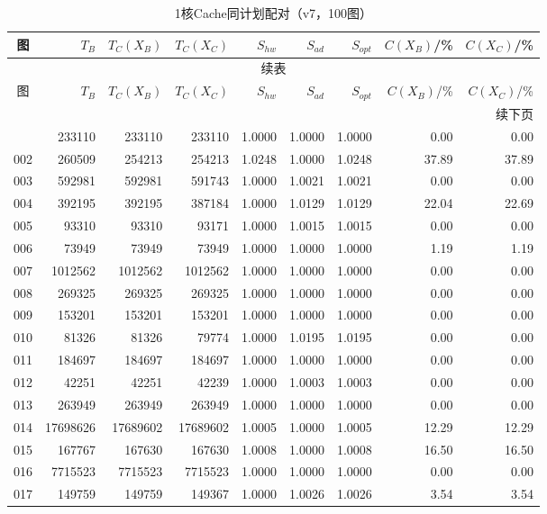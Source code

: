 \begin{longtable}{crrrrrrrr}
\caption{1核Cache同计划配对（v7，100图）}\label{tab:cache-detail-1}\\
\toprule
图 & $T_B$ & $T_C(X_B)$ & $T_C(X_C)$ & $S_{hw}$ & $S_{ad}$ & $S_{opt}$ & $C(X_B)$/\% & $C(X_C)$/\% \\
\midrule
\endfirsthead
\multicolumn{9}{c}{续表}\\
\toprule
图 & $T_B$ & $T_C(X_B)$ & $T_C(X_C)$ & $S_{hw}$ & $S_{ad}$ & $S_{opt}$ & $C(X_B)$/\% & $C(X_C)$/\% \\
\midrule
\endhead
\midrule\multicolumn{9}{r}{续下页}\\
\endfoot
\bottomrule
\endlastfoot
001 & 233110 & 233110 & 233110 & 1.0000 & 1.0000 & 1.0000 & 0.00 & 0.00 \\
002 & 260509 & 254213 & 254213 & 1.0248 & 1.0000 & 1.0248 & 37.89 & 37.89 \\
003 & 592981 & 592981 & 591743 & 1.0000 & 1.0021 & 1.0021 & 0.00 & 0.00 \\
004 & 392195 & 392195 & 387184 & 1.0000 & 1.0129 & 1.0129 & 22.04 & 22.69 \\
005 & 93310 & 93310 & 93171 & 1.0000 & 1.0015 & 1.0015 & 0.00 & 0.00 \\
006 & 73949 & 73949 & 73949 & 1.0000 & 1.0000 & 1.0000 & 1.19 & 1.19 \\
007 & 1012562 & 1012562 & 1012562 & 1.0000 & 1.0000 & 1.0000 & 0.00 & 0.00 \\
008 & 269325 & 269325 & 269325 & 1.0000 & 1.0000 & 1.0000 & 0.00 & 0.00 \\
009 & 153201 & 153201 & 153201 & 1.0000 & 1.0000 & 1.0000 & 0.00 & 0.00 \\
010 & 81326 & 81326 & 79774 & 1.0000 & 1.0195 & 1.0195 & 0.00 & 0.00 \\
011 & 184697 & 184697 & 184697 & 1.0000 & 1.0000 & 1.0000 & 0.00 & 0.00 \\
012 & 42251 & 42251 & 42239 & 1.0000 & 1.0003 & 1.0003 & 0.00 & 0.00 \\
013 & 263949 & 263949 & 263949 & 1.0000 & 1.0000 & 1.0000 & 0.00 & 0.00 \\
014 & 17698626 & 17689602 & 17689602 & 1.0005 & 1.0000 & 1.0005 & 12.29 & 12.29 \\
015 & 167767 & 167630 & 167630 & 1.0008 & 1.0000 & 1.0008 & 16.50 & 16.50 \\
016 & 7715523 & 7715523 & 7715523 & 1.0000 & 1.0000 & 1.0000 & 0.00 & 0.00 \\
017 & 149759 & 149759 & 149367 & 1.0000 & 1.0026 & 1.0026 & 3.54 & 3.54 \\

\end{longtable}
